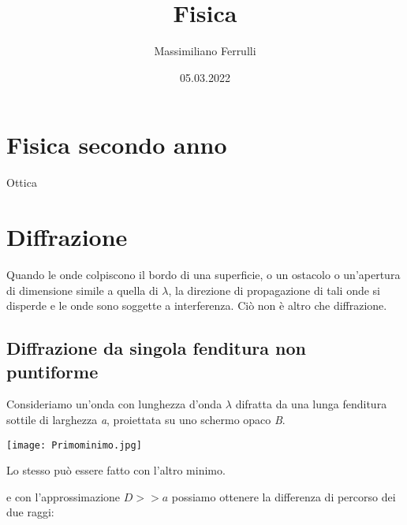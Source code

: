 \documentclass[a4paper,11pt]{article}
\begin{document}
\title{Fisica}

\author{Massimiliano Ferrulli}
\date{05.03.2022}



\maketitle

\section*{Fisica secondo anno}
Ottica

\pagebreak




\tableofcontents





\pagebreak


\section{Diffrazione}

Quando le onde colpiscono il bordo di una superficie, o un ostacolo o un'apertura di dimensione simile a quella di \(  \lambda \), la direzione di propagazione di tali onde si disperde e le onde sono soggette a interferenza. Ciò non è altro che diffrazione.

\subsection{Diffrazione da singola fenditura non puntiforme}

Consideriamo un'onda con lunghezza d'onda \( \lambda \) difratta da una lunga fenditura sottile di larghezza \textit{a}, proiettata su uno schermo opaco \textit{B}.

\vspace{1mm}

\begin{minipage}{8cm}
    \texttt{[image: Primominimo.jpg]}
    \end{minipage}
    \begin{minipage}{8cm}
    Lo stesso può essere fatto con l'altro minimo.
    \end{minipage}

    \vspace{2mm}

e con l'approssimazione \(  D >> a \) possiamo ottenere la differenza di percorso dei due raggi:
\end{document}
